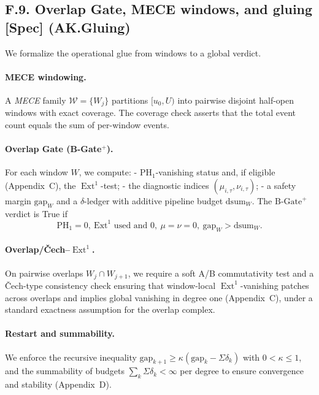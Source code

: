 \documentclass[11pt]{article}
\numberwithin{equation}{section}
\theoremstyle{plain}
\theoremstyle{definition}
\theoremstyle{remark}
\DeclareMathOperator{\Ext}{Ext}
\theoremstyle{plain}
\theoremstyle{definition}
\numberwithin{equation}{section}
\theoremstyle{definition}
\numberwithin{equation}{section}
\theoremstyle{plain}
\theoremstyle{definition}
\theoremstyle{remark}
\begin{document}
\subsection*{F.9. Overlap Gate, MECE windows, and gluing [Spec] (AK.Gluing)}

We formalize the operational glue from windows to a global verdict.

\paragraph{MECE windowing.}
A \emph{MECE} family \(\mathcal{W}=\{W_j\}\) partitions \([u_0,U)\) into pairwise disjoint half-open windows with
exact coverage. The coverage check asserts that the total event count equals the sum of per-window events.

\paragraph{Overlap Gate (B-Gate\(^+\)).}
For each window \(W\), we compute:
- \(\mathrm{PH}_1\)-vanishing status and, if eligible (Appendix~C), the \(\Ext^1\)-test;
- the diagnostic indices \((\mu_{i,\tau},\nu_{i,\tau})\);
- a safety margin \(\mathrm{gap}_W\) and a \(\delta\)-ledger with additive pipeline budget \(\mathrm{dsum}_W\).
The \(\mathrm{B\text{-}Gate}^+\) verdict is True if
\[
\mathrm{PH}_1=0,\ \mathrm{Ext}^1\text{ used and }0,\ \mu=\nu=0,\ \mathrm{gap}_W > \mathrm{dsum}_W.
\]

\paragraph{Overlap/Čech–\(\Ext^1\).}
On pairwise overlaps \(W_j\cap W_{j+1}\), we require a soft A/B commutativity test and a Čech-type
consistency check ensuring that window-local \(\Ext^1\)-vanishing patches across overlaps and implies global vanishing
in degree one (Appendix~C), under a standard exactness assumption for the overlap complex.

\paragraph{Restart and summability.}
We enforce the recursive inequality \(\mathrm{gap}_{k+1}\ge \kappa(\mathrm{gap}_k-\Sigma\delta_k)\) with \(0<\kappa\le 1\),
and the summability of budgets \(\sum_k\Sigma\delta_k<\infty\) per degree to ensure convergence and stability (Appendix~D).
\end{document}
